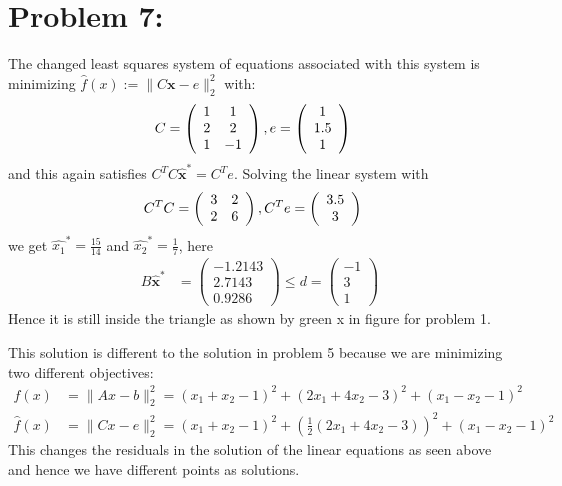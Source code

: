 \documentclass[12pt]{report}
\begin{document}
\section*{Problem 7:}
The changed least squares system of equations associated with this system is minimizing
$\hat{f}(x):=\|C\textbf{x}-e\|_2^2$ with:
\begin{align*}
C &= \left(\begin{array}{c c}
1 & 1\\
2 & 2\\
1 & -1
\end{array} \right),
e = \left(\begin{array}{c c}
1\\
1.5\\
1
\end{array} \right)
\end{align*}
and this again satisfies $C^TC\hat{\textbf{x}}^*=C^Te$. Solving the linear system with
\begin{align*}
C^TC &= \left(\begin{array}{c c}
3 & 2\\
2 & 6
\end{array} \right),
C^Te = \left(\begin{array}{c}
3.5\\
3
\end{array} \right)
\end{align*}
we get $\hat{x_1}^*=\frac{15}{14}$ and $\hat{x_2}^*=\frac{1}{7}$, here
\begin{align*}
B\hat{\textbf{x}}^* &= \left(\begin{array}{c}
-1.2143 \\
2.7143 \\
0.9286 
\end{array} \right)\leq
d = \left(\begin{array}{c}
-1\\
3\\
1
\end{array} \right)
\end{align*}
Hence it is still inside the triangle as shown by green x in figure for problem 1.

This solution is different to the solution in problem 5 because we are minimizing two different
objectives:
\begin{align*}
f(x)&=\|Ax-b\|^2_2=(x_1+x_2-1)^2+(2x_1+4x_2-3)^2+(x_1-x_2-1)^2 \\
\hat{f}(x)&=\|C{x}-e\|^2_2=(x_1+x_2-1)^2+ \left(\frac{1}{2}(2x_1+4x_2-3)\right)^2+(x_1-x_2-1)^2 
\end{align*}
This changes the residuals in the solution of the linear equations as seen above and hence we have
different points as solutions.
\end{document}
